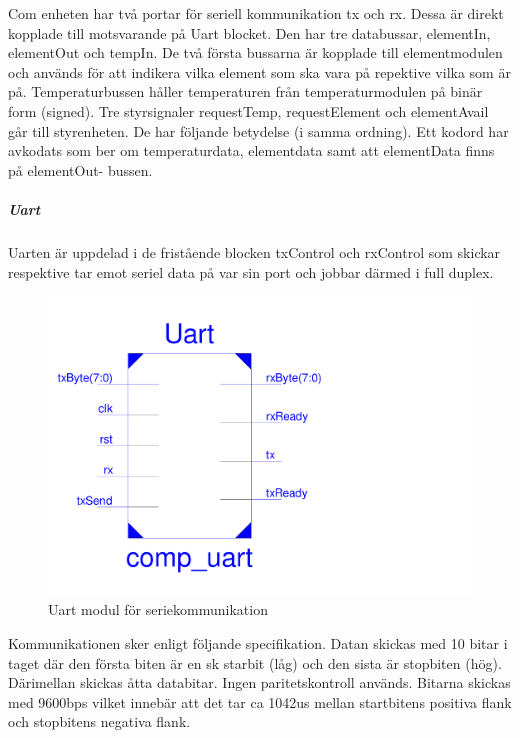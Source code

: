 \documentclass[a4paper]{scrartcl}
\begin{document}
	Com enheten har två portar för seriell kommunikation tx och rx. Dessa är direkt kopplade till motsvarande på Uart blocket.
	Den har tre databussar, elementIn, elementOut och tempIn. De två första bussarna är kopplade till elementmodulen och används för att indikera vilka element som ska vara på repektive vilka som är på. Temperaturbussen håller temperaturen 			från temperaturmodulen på binär form (signed).
		Tre styrsignaler requestTemp, requestElement och elementAvail går till styrenheten. De har följande betydelse (i samma ordning). Ett kodord har avkodats som ber om temperaturdata, elementdata samt att elementData finns på elementOut-				bussen.
		\subparagraph{Uart}		
		Uarten är uppdelad i de fristående blocken txControl och rxControl som skickar respektive tar emot seriel data på var sin port och jobbar därmed i full duplex.
	\begin{figure}[H]
			\centering
			\includegraphics[scale=0.3]{uartschematic.pdf}
			\caption{Uart modul för seriekommunikation}
		\end{figure}
	Kommunikationen sker enligt följande specifikation.
	Datan skickas med 10 bitar i taget där den första biten är en sk starbit (låg) och den sista är stopbiten (hög). Därimellan skickas åtta databitar. Ingen paritetskontroll används. Bitarna skickas med 9600bps vilket innebär att det tar ca 1042us 				mellan startbitens positiva flank och stopbitens negativa flank.
\end{document}
